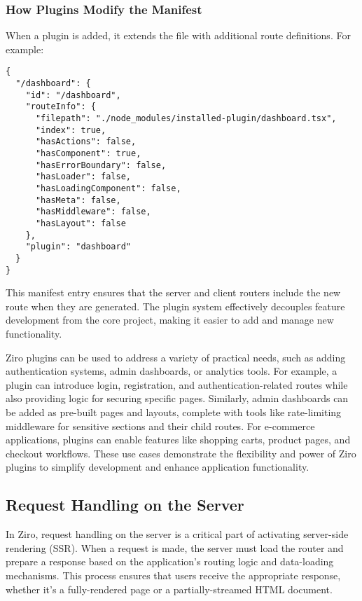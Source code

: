 \subsubsection{How Plugins Modify the Manifest}
When a plugin is added, it extends the  file with additional route definitions. For example:
\begin{verbatim}
{
  "/dashboard": {
    "id": "/dashboard",
    "routeInfo": {
      "filepath": "./node_modules/installed-plugin/dashboard.tsx",
      "index": true,
      "hasActions": false,
      "hasComponent": true,
      "hasErrorBoundary": false,
      "hasLoader": false,
      "hasLoadingComponent": false,
      "hasMeta": false,
      "hasMiddleware": false,
      "hasLayout": false
    },
    "plugin": "dashboard"
  }
}
\end{verbatim}
This manifest entry ensures that the server and client routers include the new  route when they are generated. The plugin system effectively decouples feature development from the core project, making it easier to add and manage new functionality.

Ziro plugins can be used to address a variety of practical needs, such as adding authentication systems, admin dashboards, or analytics tools. For example, a plugin can introduce login, registration, and authentication-related routes while also providing logic for securing specific pages. Similarly, admin dashboards can be added as pre-built pages and layouts, complete with tools like rate-limiting middleware for sensitive sections and their child routes. For e-commerce applications, plugins can enable features like shopping carts, product pages, and checkout workflows. These use cases demonstrate the flexibility and power of Ziro plugins to simplify development and enhance application functionality.

\subsection{Request Handling on the Server}

In Ziro, request handling on the server is a critical part of activating server-side rendering (SSR). When a request is made, the server must load the router and prepare a response based on the application’s routing logic and data-loading mechanisms. This process ensures that users receive the appropriate response, whether it’s a fully-rendered page or a partially-streamed HTML document.

